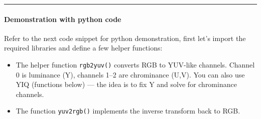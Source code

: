 \documentclass[11pt]{article}
\providecommand{\tightlist}{%
      \setlength{\itemsep}{0pt}\setlength{\parskip}{0pt}}
\begin{document}
\begin{center}\rule{0.5\linewidth}{0.5pt}\end{center}

\hypertarget{demonstration-with-python-code}{%
\paragraph{\texorpdfstring{\textbf{Demonstration with python
code}}{Demonstration with python code}}\label{demonstration-with-python-code}}

Refer to the next code snippet for python demonstration, first let's
import the required libraries and define a few helper functions:

\begin{itemize}
\tightlist
\item
  The helper function \texttt{rgb2yuv()} converts RGB to YUV-like
  channels. Channel 0 is luminance (Y), channels 1--2 are chrominance
  (U,V). You can also use YIQ (functions below) --- the idea is to fix Y
  and solve for chrominance channels.
\item
  The function \texttt{yuv2rgb()} implements the inverse transform back
  to RGB.
\end{itemize}
\end{document}
